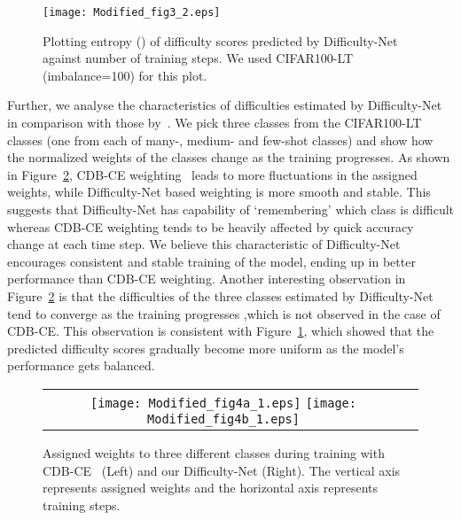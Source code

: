 \documentclass[10pt,twocolumn,letterpaper]{article}
\begin{document}
\begin{figure}[t]
\begin{center}
\texttt{[image: Modified\_fig3\_2.eps]}
\end{center}
\caption{Plotting entropy () of difficulty scores predicted by Difficulty-Net against number of training steps. We used CIFAR100-LT (imbalance=100) for this plot. }
\label{fig:weight_entropy}
\end{figure}
Further, we analyse the characteristics of difficulties estimated by Difficulty-Net in comparison with those by~\cite{cdb-ce}. 
We pick three classes from the CIFAR100-LT classes (one from each of many-, medium- and few-shot classes) and show how the normalized weights of the classes change as the training progresses.
As shown in Figure~\ref{weight-analysis}, CDB-CE weighting~\cite{cdb-ce} leads to more fluctuations in the assigned weights, while Difficulty-Net based weighting is more smooth and stable. This suggests that Difficulty-Net has capability of `remembering' which class is difficult whereas CDB-CE weighting tends to be heavily affected by quick accuracy change at each time step. We believe this characteristic of Difficulty-Net encourages consistent and stable training of the model, ending up in better performance than CDB-CE weighting. Another interesting observation in Figure~\ref{weight-analysis} is that the difficulties of the three classes estimated by Difficulty-Net tend to converge as the training progresses 
,which is not observed in the case of CDB-CE. 
This observation is consistent with Figure~\ref{fig:weight_entropy}, which showed that the predicted difficulty scores gradually become more uniform as the 
model's performance gets balanced.

\begin{figure}[t]
  \begin{center}
      
  
  \begin{tabular}{cc}
\texttt{[image: Modified\_fig4a\_1.eps]}  \hfill
\texttt{[image: Modified\_fig4b\_1.eps]} \end{tabular}
\caption{Assigned weights to three different classes during training with CDB-CE~\cite{cdb-ce} (Left) and our Difficulty-Net (Right). The vertical axis represents assigned weights and the horizontal axis represents training steps.}
  \label{weight-analysis}
  \end{center}
\end{figure}
\end{document}
